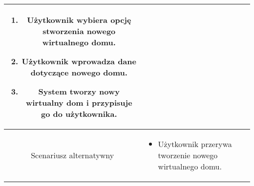 \documentclass{article}
\begin{document}
\begin{enumerate}
\begin{enumerate}
\begin{table}[H]
\begin{tabular}{|c|p{7cm}|}
\begin{enumerate}
\item Użytkownik wybiera opcję stworzenia nowego wirtualnego domu.

\item Użytkownik wprowadza dane dotyczące nowego domu.

\item System tworzy nowy wirtualny dom i przypisuje go do użytkownika.\end{enumerate} \\
						\hline
						Scenariusz alternatywny & \begin{itemize}\item Użytkownik przerywa tworzenie nowego wirtualnego domu.\end{itemize}                                                                                                                                                                              \\
						\hline
					\end{tabular}
				\end{table}


\end{enumerate}
\end{enumerate}
\end{document}
